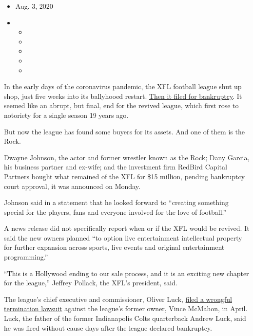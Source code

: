 \begin{itemize}
\item
  Aug. 3, 2020
\item
  \begin{itemize}
  \item
  \item
  \item
  \item
  \item
  \end{itemize}
\end{itemize}

In the early days of the coronavirus pandemic, the XFL football league
shut up shop, just five weeks into its ballyhooed restart.
\href{https://www.nytimes3xbfgragh.onion/2020/04/13/sports/football/xfl-bankruptcy-vince-mcmahon.html}{Then
it filed for bankruptcy}. It seemed like an abrupt, but final, end for
the revived league, which first rose to notoriety for a single season 19
years ago.

But now the league has found some buyers for its assets. And one of them
is the Rock.

Dwayne Johnson, the actor and former wrestler known as the Rock; Dany
Garcia, his business partner and ex-wife; and the investment firm
RedBird Capital Partners bought what remained of the XFL for \$15
million, pending bankruptcy court approval, it was announced on Monday.

Johnson said in a statement that he looked forward to ``creating
something special for the players, fans and everyone involved for the
love of football.''

A news release did not specifically report when or if the XFL would be
revived. It said the new owners planned ``to option live entertainment
intellectual property for further expansion across sports, live events
and original entertainment programming.''

``This is a Hollywood ending to our sale process, and it is an exciting
new chapter for the league,'' Jeffrey Pollack, the XFL's president,
said.

The league's chief executive and commissioner, Oliver Luck,
\href{https://www.nytimes3xbfgragh.onion/2020/04/21/sports/football/xfl-oliver-luck-vince-mcmahon-sued.html}{filed
a wrongful termination lawsuit} against the league's former owner, Vince
McMahon, in April. Luck, the father of the former Indianapolis Colts
quarterback Andrew Luck, said he was fired without cause days after the
league declared bankruptcy.

